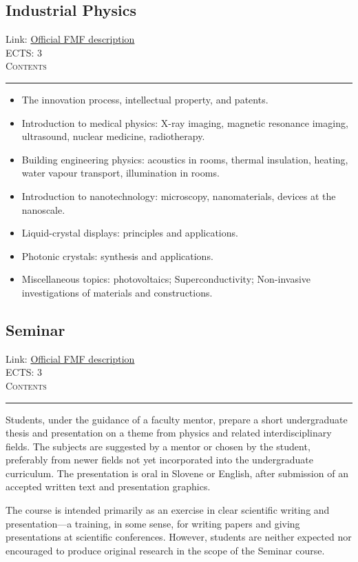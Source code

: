 \documentclass[11pt, a4paper]{article}
\newenvironment{course}[3]{
\subsection{#1}%
Link: \href{#2}{Official FMF description}\\%
ECTS: #3%
\vspace{1ex}
\\
{\large \textsc{Contents}}\\[-0.9ex]%
\rule{\textwidth}{0.5pt}
\vspace{-3ex}
}
{}
\newenvironment{chapter}[1]{
\begin{tcolorbox}[title=#1, breakable]
}
{\end{tcolorbox}}
\begin{document}
\begin{course}{Industrial Physics}{https://www.fmf.uni-lj.si/en/study-physics/programmes/1fiz/2020/7000777/courses/1149/}{3}
    \label{industrial_physics}

    \begin{chapter}{Material}
        \begin{itemize}
        
            \item The innovation process, intellectual property, and patents.

            \item Introduction to medical physics: X-ray imaging, magnetic resonance imaging, ultrasound, nuclear medicine, radiotherapy.

            \item Building engineering physics: acoustics in rooms, thermal insulation, heating, water vapour transport, illumination in rooms.

            \item Introduction to nanotechnology: microscopy, nanomaterials, devices at the nanoscale. 

            \item Liquid-crystal displays: principles and applications.

            \item Photonic crystals: synthesis and applications.

            \item Miscellaneous topics: photovoltaics; Superconductivity; Non-invasive investigations of materials and constructions.
        
        \end{itemize}
    \end{chapter}
\end{course}

\begin{course}{Seminar}{https://www.fmf.uni-lj.si/en/study-physics/programmes/1fiz/2020/7000777/courses/1173/}{3}
    \label{seminar}

    \begin{chapter}{Course description}
        Students, under the guidance of a faculty mentor, prepare a short undergraduate thesis and presentation on a theme from physics and related interdisciplinary fields.
        The subjects are suggested by a mentor or chosen by the student, preferably from newer fields not yet incorporated into the undergraduate curriculum.
        The presentation is oral in Slovene or English, after submission of an accepted written text and presentation graphics.

        The course is intended primarily as an exercise in clear scientific writing and presentation---a training, in some sense, for writing papers and giving presentations at scientific conferences.
        However, students are neither expected nor encouraged to produce original research in the scope of the Seminar course.

    \end{chapter}
\end{course}
\end{document}
